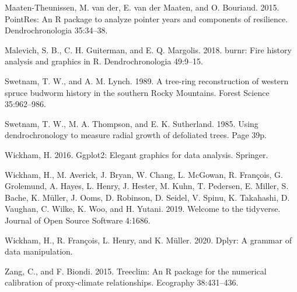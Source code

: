 \documentclass[review]{elsarticle} %
\begin{document}
\leavevmode\hypertarget{ref-VanderMaaten-Theunissen2015}{}%
Maaten-Theunissen, M. van der, E. van der Maaten, and O. Bouriaud. 2015.
PointRes: An R package to analyze pointer years and components of
resilience. Dendrochronologia 35:34--38.

\leavevmode\hypertarget{ref-Malevich2018}{}%
Malevich, S. B., C. H. Guiterman, and E. Q. Margolis. 2018. burnr: Fire
history analysis and graphics in R. Dendrochronologia 49:9--15.

\leavevmode\hypertarget{ref-Swetnam1989}{}%
Swetnam, T. W., and A. M. Lynch. 1989. A tree-ring reconstruction of
western spruce budworm history in the southern Rocky Mountains. Forest
Science 35:962--986.

\leavevmode\hypertarget{ref-Swetnam1985}{}%
Swetnam, T. W., M. A. Thompson, and E. K. Sutherland. 1985. Using
dendrochronology to measure radial growth of defoliated trees. Page 39p.

\leavevmode\hypertarget{ref-wickham2016ggplot2}{}%
Wickham, H. 2016. Ggplot2: Elegant graphics for data analysis. Springer.

\leavevmode\hypertarget{ref-Wickham2019}{}%
Wickham, H., M. Averick, J. Bryan, W. Chang, L. McGowan, R. François, G.
Grolemund, A. Hayes, L. Henry, J. Hester, M. Kuhn, T. Pedersen, E.
Miller, S. Bache, K. Müller, J. Ooms, D. Robinson, D. Seidel, V. Spinu,
K. Takahashi, D. Vaughan, C. Wilke, K. Woo, and H. Yutani. 2019. Welcome
to the tidyverse. Journal of Open Source Software 4:1686.

\leavevmode\hypertarget{ref-Wickham2020dplyr}{}%
Wickham, H., R. François, L. Henry, and K. Müller. 2020. Dplyr: A
grammar of data manipulation.

\leavevmode\hypertarget{ref-Zang2015}{}%
Zang, C., and F. Biondi. 2015. Treeclim: An R package for the numerical
calibration of proxy-climate relationships. Ecography 38:431--436.
\end{document}
